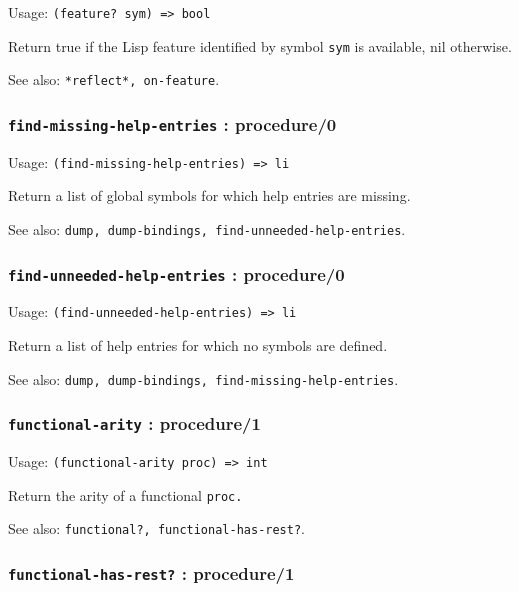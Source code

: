 \documentclass[
]{article}
\newcommand{\passthrough}[1]{#1}
\begin{document}
Usage: \passthrough{\lstinline!(feature? sym) => bool!}

Return true if the Lisp feature identified by symbol
\passthrough{\lstinline!sym!} is available, nil otherwise.

See also: \passthrough{\lstinline!*reflect*, on-feature!}.

\hypertarget{find-missing-help-entries-procedure0}{%
\subsubsection{\texorpdfstring{\texttt{find-missing-help-entries} :
procedure/0}{find-missing-help-entries : procedure/0}}\label{find-missing-help-entries-procedure0}}

Usage: \passthrough{\lstinline!(find-missing-help-entries) => li!}

Return a list of global symbols for which help entries are missing.

See also:
\passthrough{\lstinline!dump, dump-bindings, find-unneeded-help-entries!}.

\hypertarget{find-unneeded-help-entries-procedure0}{%
\subsubsection{\texorpdfstring{\texttt{find-unneeded-help-entries} :
procedure/0}{find-unneeded-help-entries : procedure/0}}\label{find-unneeded-help-entries-procedure0}}

Usage: \passthrough{\lstinline!(find-unneeded-help-entries) => li!}

Return a list of help entries for which no symbols are defined.

See also:
\passthrough{\lstinline!dump, dump-bindings, find-missing-help-entries!}.

\hypertarget{functional-arity-procedure1}{%
\subsubsection{\texorpdfstring{\texttt{functional-arity} :
procedure/1}{functional-arity : procedure/1}}\label{functional-arity-procedure1}}

Usage: \passthrough{\lstinline!(functional-arity proc) => int!}

Return the arity of a functional \passthrough{\lstinline!proc.!}

See also: \passthrough{\lstinline!functional?, functional-has-rest?!}.

\hypertarget{functional-has-rest-procedure1}{%
\subsubsection{\texorpdfstring{\texttt{functional-has-rest?} :
procedure/1}{functional-has-rest? : procedure/1}}\label{functional-has-rest-procedure1}}
\end{document}
